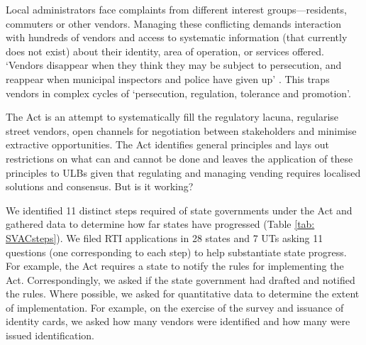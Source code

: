 \documentclass[a4paper, 12pt, twoside]{article}
\begin{document}
{	Local administrators face complaints from different interest groups—residents, commuters or other vendors. Managing these conflicting demands interaction with hundreds of vendors and access to systematic information (that currently does not exist) about their identity, area of operation, or services offered. `Vendors disappear when they think they may be subject to persecution, and reappear when municipal inspectors and police have given up' \parencite{bromleypaper}. This traps vendors in complex cycles of `persecution, regulation, tolerance and promotion'.

	The Act is an attempt to systematically fill the regulatory lacuna, regularise street vendors, open channels for negotiation between stakeholders and minimise extractive opportunities. The Act identifies general principles and lays out restrictions on what can and cannot be done and leaves the application of these principles to ULBs given that regulating and managing vending requires localised solutions and consensus. But is it working?

	We identified 11 distinct steps required of state governments under the Act and gathered data to determine how far states have progressed (Table \ref{tab: SVACsteps}). We filed RTI applications in 28 states and 7 UTs asking 11 questions (one corresponding to each step) to help substantiate state progress. For example, the Act requires a state to notify the rules for implementing the Act. Correspondingly, we asked if the state government had drafted and notified the rules. Where possible, we asked for quantitative data to determine the extent of implementation. For example, on the exercise of the survey and issuance of identity cards, we asked how many vendors were identified and how many were issued identification.

}
\end{document}
